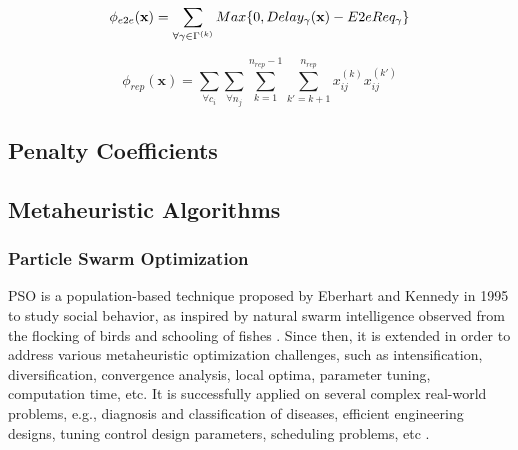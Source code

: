 \begin{equation}
\label{}
    \phi_{e2e}(\textbf{x}) = \sum_{\forall \gamma \in \ssp{\Gamma}}{Max \{0, Delay_\gamma(\x) - E2eReq_\gamma \}}
\end{equation}

\begin{equation}
\label{}
    \phi_{rep}(\textbf{x}) = \sum_{\forall c_i}{\sum_{\forall n_j}{\sum_{k=1}^{n_{rep}-1}{\sum_{k'=k+1}^{n_{rep}} x_{ij}^{(k)} x_{ij}^{(k')}}}}
\end{equation}



\subsection{Penalty Coefficients}
\label{sec:penaltycoefficient}

\subsection{Metaheuristic Algorithms}
\subsubsection{Particle Swarm Optimization}
PSO is a population-based technique proposed by Eberhart and Kennedy in 1995 to study social behavior, as inspired by natural swarm intelligence observed from the flocking of birds and schooling of fishes \cite{Kennedy1995ParticleOptimization}. Since then, it is extended in order to address various metaheuristic optimization challenges, such as intensification, diversification, convergence analysis, local optima, parameter tuning, computation time, etc. It is successfully applied on several complex real-world problems, e.g., diagnosis and classification of diseases, efficient engineering designs, tuning control design parameters, scheduling problems, etc \cite{Poli2008AnApplications}. 

